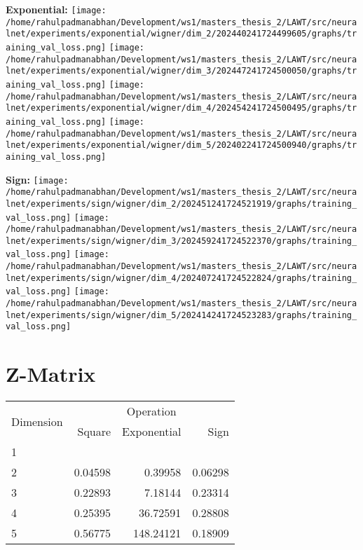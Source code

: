 \documentclass{article}
\begin{document}
\textbf{Exponential:}
\texttt{[image: /home/rahulpadmanabhan/Development/ws1/masters\_thesis\_2/LAWT/src/neuralnet/experiments/exponential/wigner/dim\_2/202440241724499605/graphs/training\_val\_loss.png]}
\texttt{[image: /home/rahulpadmanabhan/Development/ws1/masters\_thesis\_2/LAWT/src/neuralnet/experiments/exponential/wigner/dim\_3/202447241724500050/graphs/training\_val\_loss.png]}
\texttt{[image: /home/rahulpadmanabhan/Development/ws1/masters\_thesis\_2/LAWT/src/neuralnet/experiments/exponential/wigner/dim\_4/202454241724500495/graphs/training\_val\_loss.png]}
\texttt{[image: /home/rahulpadmanabhan/Development/ws1/masters\_thesis\_2/LAWT/src/neuralnet/experiments/exponential/wigner/dim\_5/202402241724500940/graphs/training\_val\_loss.png]}

\textbf{Sign:}
\texttt{[image: /home/rahulpadmanabhan/Development/ws1/masters\_thesis\_2/LAWT/src/neuralnet/experiments/sign/wigner/dim\_2/202451241724521919/graphs/training\_val\_loss.png]}
\texttt{[image: /home/rahulpadmanabhan/Development/ws1/masters\_thesis\_2/LAWT/src/neuralnet/experiments/sign/wigner/dim\_3/202459241724522370/graphs/training\_val\_loss.png]}
\texttt{[image: /home/rahulpadmanabhan/Development/ws1/masters\_thesis\_2/LAWT/src/neuralnet/experiments/sign/wigner/dim\_4/202407241724522824/graphs/training\_val\_loss.png]}
\texttt{[image: /home/rahulpadmanabhan/Development/ws1/masters\_thesis\_2/LAWT/src/neuralnet/experiments/sign/wigner/dim\_5/202414241724523283/graphs/training\_val\_loss.png]}



\pagebreak
\section{Z-Matrix}
\begin{tabular}{@{}lrrr@{}}
\toprule
\multirow{2}{*}{Dimension} & \multicolumn{3}{c}{Operation} \\
\cmidrule(l){2-4}
& Square & Exponential & Sign \\
\midrule
1 & & & \\
2 & 0.04598 & 0.39958 & 0.06298 \\
3 & 0.22893 & 7.18144 & 0.23314 \\
4 & 0.25395 & 36.72591 & 0.28808 \\
5 & 0.56775 & 148.24121 & 0.18909 \\
\bottomrule
\end{tabular}
\end{document}
